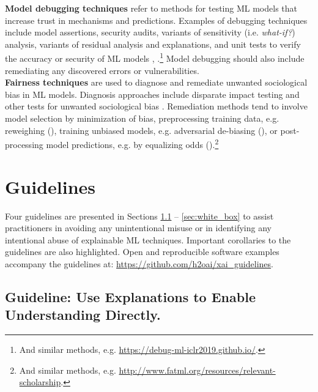 \documentclass[sigconf]{acmart}
\begin{document}
\vspace{-8pt}
\noindent\textbf{Model debugging techniques} refer to methods for testing ML models that increase trust in mechanisms and predictions. Examples of debugging techniques include model assertions, security audits, variants of sensitivity (i.e. \textit{what-if?}) analysis, variants of residual analysis and explanations, and unit tests to verify the accuracy or security of ML models \cite{modeltracker}, \cite{kangdebugging}.\footnote{And similar methods, e.g. \url{https://debug-ml-iclr2019.github.io/}.} Model debugging should also include remediating any discovered errors or vulnerabilities.\\

\vspace{-8pt}
\noindent\textbf{Fairness techniques} are used to diagnose and remediate unwanted sociological bias in ML models. Diagnosis approaches include disparate impact testing and other tests for unwanted sociological bias \cite{feldman2015certifying}. Remediation methods tend to involve model selection by minimization of bias, preprocessing training data, e.g. reweighing (\citet{kamiran2012data}), training unbiased models, e.g. adversarial de-biasing (\citet{zhang2018mitigating}), or post-processing model predictions, e.g. by equalizing odds (\citet{hardt2016equality}).\footnote{And similar methods, e.g. \url{http://www.fatml.org/resources/relevant-scholarship}.} 

\section{Guidelines}

Four guidelines are presented in Sections \ref{sec:trust} -- \ref{sec:white_box} to assist practitioners in avoiding any unintentional misuse or in identifying any intentional abuse of explainable ML techniques. Important corollaries to the guidelines are also highlighted. Open and reproducible software examples accompany the guidelines at: \url{https://github.com/h2oai/xai_guidelines}.

\subsection{Guideline: Use Explanations to Enable Understanding Directly.} \label{sec:trust}
\end{document}
